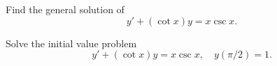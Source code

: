\setcounter{example}{5}
\setcounter{equation}{19}
\begin{example}
  \label{example:2.1.6}\rm\mbox{}%
  \begin{alist}
    \item %
    Find the general solution
    of \begin{equation}
      \label{eq:2.1.20}y'+(\cot x)y=x\csc x.
    \end{equation}

    \item %
    Solve the initial value problem
    \begin{equation}
      \label{eq:2.1.21}y'+(\cot x)y=x\csc x,\quad y(\pi/2)=1.
    \end{equation}
  \end{alist}
\end{example}
\setcounter{equation}{21}
\setcounter{figure}{3}
